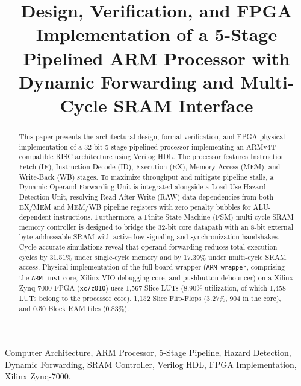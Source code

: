 \documentclass[conference]{IEEEtran}
\begin{document}
\title{Design, Verification, and FPGA Implementation of a 5-Stage Pipelined ARM Processor with Dynamic Forwarding and Multi-Cycle SRAM Interface}

\author{
}

\maketitle

\begin{abstract}
This paper presents the architectural design, formal verification, and FPGA physical implementation of a 32-bit 5-stage pipelined processor implementing an ARMv4T-compatible RISC architecture using Verilog HDL. The processor features Instruction Fetch (IF), Instruction Decode (ID), Execution (EX), Memory Access (MEM), and Write-Back (WB) stages. To maximize throughput and mitigate pipeline stalls, a Dynamic Operand Forwarding Unit is integrated alongside a Load-Use Hazard Detection Unit, resolving Read-After-Write (RAW) data dependencies from both EX/MEM and MEM/WB pipeline registers with zero penalty bubbles for ALU-dependent instructions. Furthermore, a Finite State Machine (FSM) multi-cycle SRAM memory controller is designed to bridge the 32-bit core datapath with an 8-bit external byte-addressable SRAM with active-low signaling and synchronization handshakes. Cycle-accurate simulations reveal that operand forwarding reduces total execution cycles by 31.51\% under single-cycle memory and by 17.39\% under multi-cycle SRAM access. Physical implementation of the full board wrapper (\texttt{ARM\_wrapper}, comprising the \texttt{ARM\_inst} core, Xilinx VIO debugging core, and pushbutton debouncer) on a Xilinx Zynq-7000 FPGA (\texttt{xc7z010}) uses 1,567 Slice LUTs (8.90\% utilization, of which 1,458 LUTs belong to the processor core), 1,152 Slice Flip-Flops (3.27\%, 904 in the core), and 0.50 Block RAM tiles (0.83\%).
\end{abstract}

\begin{IEEEkeywords}
Computer Architecture, ARM Processor, 5-Stage Pipeline, Hazard Detection, Dynamic Forwarding, SRAM Controller, Verilog HDL, FPGA Implementation, Xilinx Zynq-7000.
\end{IEEEkeywords}
\end{document}
